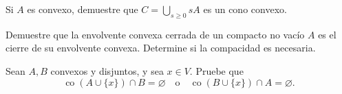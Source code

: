 \begin{ejercicio}\label{ej:lectura-24-5}
Si $A$ es convexo, demuestre que $C=\bigcup_{s\geq0}sA$ es un cono convexo.
\end{ejercicio}


\begin{ejercicio}\label{ej:lectura-24-6}
Demuestre que la envolvente convexa cerrada de un compacto no vacío $A$ es el cierre de su envolvente convexa. Determine si la compacidad es necesaria.
\end{ejercicio}


\begin{ejercicio}\label{ej:lectura-24-7}
Sean $A,B$ convexos y disjuntos, y sea $x\in V$. Pruebe que
\[
 \operatorname{co}(A\cup\{x\})\cap B=\varnothing
 \quad\text{o}\quad
 \operatorname{co}(B\cup\{x\})\cap A=\varnothing.
\]
\end{ejercicio}
